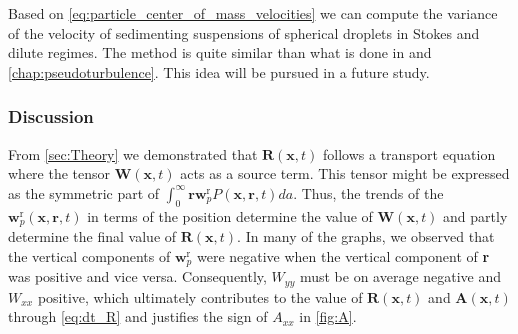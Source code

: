 Based on \ref{eq:particle_center_of_mass_velocities} we can compute the variance of the velocity of sedimenting suspensions of spherical droplets in Stokes and dilute regimes.
The method is quite similar than what is done in \citet{zhang2021ensemble} and \ref{chap:pseudoturbulence}. 
This idea will be pursued in a future study. 


\subsubsection{Discussion}

    

From \ref{sec:Theory} we demonstrated that $\textbf{R}(\textbf{x},t)$ follows a transport equation where the tensor $\textbf{W}(\textbf{x},t)$ acts as a source term. 
This tensor might be expressed as the symmetric part of $\int_0^\infty \textbf{r} \textbf{w}_p^\text{r} P(\textbf{x},\textbf{r},t) da$. 
Thus, the trends of the $\textbf{w}_p^\text{r}(\textbf{x},\textbf{r},t) $ in terms of the position determine the value of $\textbf{W}(\textbf{x},t)$ and partly determine the final value of $\textbf{R}(\textbf{x},t)$. 
In many of the graphs, we observed that the vertical components of $\textbf{w}_p^\text{r}$ were negative when the vertical component of \textbf{r} was positive and vice versa. 
Consequently, $W_{yy}$ must be on average negative and $W_{xx}$ positive, which ultimately contributes to the value of $\textbf{R}(\textbf{x},t)$ and $\textbf{A}(\textbf{x},t)$ through \ref{eq:dt_R} and justifies the sign of $A_{xx}$ in \ref{fig:A}. 

